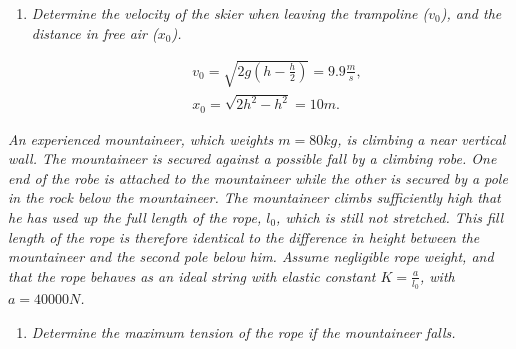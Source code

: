 \begin{example}
\begin{enumerate}
		\item \emph{Determine the velocity of the skier when leaving the trampoline ($v_0$), and the distance in free air ($x_0$).}
		
		\begin{equation}
			\begin{split}
				&v_0=\sqrt{2g(h-\frac{h}{2})}=9.9\frac{m}{s},\\
				&x_0=\sqrt{2h^2-h^2}=10m.
			\end{split}
		\end{equation} 
	\end{enumerate}
\end{example}
\begin{example}
	\emph{An experienced mountaineer, which weights $m=80kg$, is climbing a near vertical wall. The mountaineer is secured against a possible fall by a climbing robe. One end of the robe is attached to the mountaineer while the other is secured by a pole in the rock below the mountaineer. The mountaineer climbs sufficiently high that he has used up the full length of the rope, $l_0$, which is still not stretched. This fill length of the rope is therefore identical to the difference in height between the mountaineer and the second pole below him. Assume negligible rope weight, and that the rope behaves as an ideal string with elastic constant $K=\frac{a}{l_0}$, with $a=40000N$.}
	
	\begin{enumerate}
		\item \emph{Determine the maximum tension of the rope if the mountaineer falls.}
		

\end{enumerate}
\end{example}
